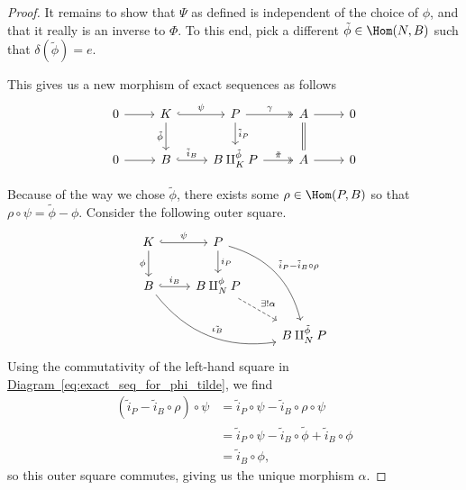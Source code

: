 \documentclass[main.tex]{subfiles}
\begin{document}
\begin{proof}
  It remains to show that $\Psi$ as defined is independent of the choice of $\phi$, and that it really is an inverse to $\Phi$. To this end, pick a different $\tilde{\phi} \in \Hom(N, B)$ such that $\delta(\tilde{\phi}) = e$.

  This gives us a new morphism of exact sequences as follows
  \begin{equation}
    \label{eq:exact_seq_for_phi_tilde}
    \begin{tikzcd}
      0
      \arrow[r]
      & K
      \arrow[r, hook, "\psi"]
      \arrow[d, swap, "\tilde{\phi}"]
      & P
      \arrow[r, two heads, "\gamma"]
      \arrow[d, "\tilde{i}_{P}"]
      & A
      \arrow[r]
      \arrow[d, equals]
      & 0
      \\
      0
      \arrow[r]
      & B
      \arrow[r, hook, "\tilde{i}_{B}"]
      & B \amalg^{\tilde{\phi}}_{K} P
      \arrow[r, two heads, "\tilde{\pi}"]
      & A
      \arrow[r]
      & 0
    \end{tikzcd}
  \end{equation}

  Because of the way we chose $\tilde{\phi}$, there exists some $\rho \in \Hom(P, B)$ so that $\rho \circ \psi = \tilde{\phi} - \phi$. Consider the following outer square.
  \begin{equation}
    \label{eq:morphism_interpolating_extensions}
    \begin{tikzcd}
      K
      \arrow[r, hook, "\psi"]
      \arrow[d, swap, "\phi"]
      & P
      \arrow[ddr, bend left, "\tilde{i}_{P} - \tilde{i}_{B} \circ \rho"]
      \arrow[d, "i_{P}"]
      \\
      B
      \arrow[r, hook, "i_{B}"]
      \arrow[rrd, bend right, "\tilde{\iota_{B}}"]
      & B \amalg_{N}^{\phi} P
      \arrow[dr, dashed, "\exists!\alpha"]
      \\
      && B \amalg_{N}^{\tilde{\phi}} P
    \end{tikzcd}
  \end{equation}
  Using the commutativity of the left-hand square in \hyperref[eq:exact_seq_for_phi_tilde]{Diagram~\ref*{eq:exact_seq_for_phi_tilde}}, we find
  \begin{align*}
    (\tilde{i}_{P} - \tilde{i}_{B} \circ \rho) \circ \psi &=\tilde{i}_{P} \circ \psi - \tilde{i}_{B} \circ \rho \circ \psi \\
    &= \tilde{i}_{P} \circ \psi - \tilde{i}_{B} \circ \tilde{\phi} + \tilde{i}_{B} \circ \phi \\
    &= \tilde{i}_{B} \circ \phi,
  \end{align*}
  so this outer square commutes, giving us the unique morphism $\alpha$.


\end{proof}
\end{document}
